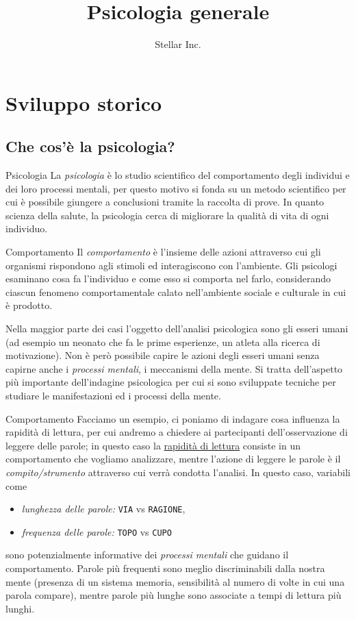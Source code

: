 \documentclass[a4paper]{article}
\title{Psicologia generale}
\author{Stellar Inc.}
\date{}
\begin{document}
\maketitle
\tableofcontents

\section{Sviluppo storico}

\subsection{Che cos'è la psicologia?}

\begin{snippetdefinition}{Psicologia}
    La \emph{psicologia} è lo studio scientifico del comportamento degli individui e dei loro processi mentali, per questo motivo si fonda su un metodo scientifico per cui è possibile giungere a conclusioni tramite la raccolta di prove. In quanto scienza della salute, la psicologia cerca di migliorare la qualità di vita di ogni individuo.
\end{snippetdefinition}
\begin{snippetdefinition}{Comportamento}
    Il \emph{comportamento} è l'insieme delle azioni attraverso cui gli organismi rispondono agli stimoli ed interagiscono con l'ambiente. Gli psicologi esaminano cosa fa l'individuo e come esso si comporta nel farlo, considerando ciascun fenomeno comportamentale calato nell'ambiente sociale e culturale in cui è prodotto.
\end{snippetdefinition}
Nella maggior parte dei casi l'oggetto dell'analisi psicologica sono gli esseri umani (ad esempio un neonato che fa le prime esperienze, un atleta alla ricerca di motivazione). Non è però possibile capire le azioni degli esseri umani senza capirne anche i \emph{processi mentali}, i meccanismi della mente. Si tratta dell'aspetto più importante dell'indagine psicologica per cui si sono sviluppate tecniche per studiare le manifestazioni ed i processi della mente.
\begin{snippetexample}{Comportamento}
    Facciamo un esempio, ci poniamo di indagare cosa influenza la rapidità di lettura, per cui andremo a chiedere ai partecipanti dell'osservazione di leggere delle parole; in questo caso la \underline{rapidità di lettura} consiste in un comportamento che vogliamo analizzare, mentre l'azione di leggere le parole è il \emph{compito/strumento} attraverso cui verrà condotta l'analisi. In questo caso, variabili come
    \begin{itemize}
        \item \emph{lunghezza delle parole:} \texttt{VIA} vs \texttt{RAGIONE},
        \item \emph{frequenza delle parole:} \texttt{TOPO} vs \texttt{CUPO}
    \end{itemize} sono potenzialmente informative dei \emph{processi mentali} che guidano il comportamento. Parole più frequenti sono meglio discriminabili dalla nostra mente (presenza di un sistema memoria, sensibilità al numero di volte in cui una parola compare), mentre parole più lunghe sono associate a tempi di lettura più lunghi.
\end{snippetexample}
\end{document}
